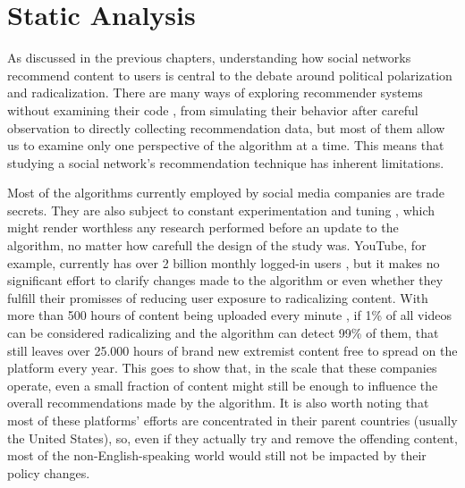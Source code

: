 





\chapter{Static Analysis}
\label{cap:static}

As discussed in the previous chapters, understanding how social networks
recommend content to users is central to the debate around political
polarization and radicalization. There are many ways of exploring recommender
systems without examining their code \citep{}, from simulating their behavior
after careful observation to directly collecting recommendation data, but most
of them allow us to examine only one perspective of the algorithm at a time.
This means that studying a social network's recommendation technique has
inherent limitations.

Most of the algorithms currently employed by social media companies are trade
secrets. They are also subject to constant experimentation and tuning \citep{},
which might render worthless any research performed before an update to the
algorithm, no matter how carefull the design of the study was. YouTube, for
example, currently has over 2 billion monthly logged-in users \citep{}, but it
makes no significant effort to clarify changes made to the algorithm or even
whether they fulfill their promisses of reducing user exposure to radicalizing
content. With more than 500 hours of content being uploaded every minute
\citep{}, if 1\% of all videos can be considered radicalizing and the algorithm
can detect 99\% of them, that still leaves over 25.000 hours of brand new
extremist content free to spread on the platform every year. This goes to show
that, in the scale that these companies operate, even a small fraction of
content might still be enough to influence the overall recommendations made by
the algorithm. It is also worth noting that most of these platforms' efforts are
concentrated in their parent countries (usually the United States), so, even if
they actually try and remove the offending content, most of the
non-English-speaking world would still not be impacted by their policy changes.

